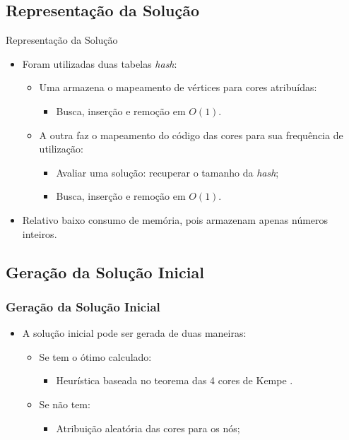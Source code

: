 \documentclass[compress, hide notes]{beamer}
\let\olditem=\item%
\renewcommand{\item}{\olditem \justifying}%
\begin{document}
 
 
 \subsection{Representação da Solução}
 
 \begin{frame}{Representação da Solução}
 
   \begin{itemize}
     \item Foram utilizadas duas tabelas \textit{hash}:
     \bigskip
     \begin{itemize}
       \item Uma armazena o mapeamento de vértices para cores atribuídas:
       \begin{itemize}
       	\item Busca, inserção e remoção em $O(1)$.
     \bigskip
     \bigskip
       \end{itemize}
       \item A outra faz o mapeamento do código das cores para sua frequência de utilização:
       \begin{itemize}
         \item Avaliar uma solução: recuperar o tamanho da \textit{hash};
     \bigskip
         \item Busca, inserção e remoção em $O(1)$.
     \bigskip
       \end{itemize}
     \end{itemize}
     \item Relativo baixo consumo de memória, pois armazenam apenas números inteiros.
   \end{itemize}
 
 
 \end{frame}
 
 \subsection{Geração da Solução Inicial}
 
 \begin{frame}
 \frametitle{Geração da Solução Inicial}
 
 \begin{itemize}
 \item A solução inicial pode ser gerada de duas maneiras:
 \bigskip
 \begin{itemize}
 \item Se tem o ótimo calculado:
 \bigskip
 \begin{itemize}
 \item Heurística baseada no teorema das 4 cores de Kempe \cite{kempe1879}.
 \end{itemize}
 \bigskip
 \bigskip
 \item Se não tem:
 \bigskip
 \begin{itemize}
 \item Atribuição aleatória das cores para os nós;
 \end{itemize}
 \end{itemize}
 \end{itemize}
 
 \end{frame}
 
\end{document}
